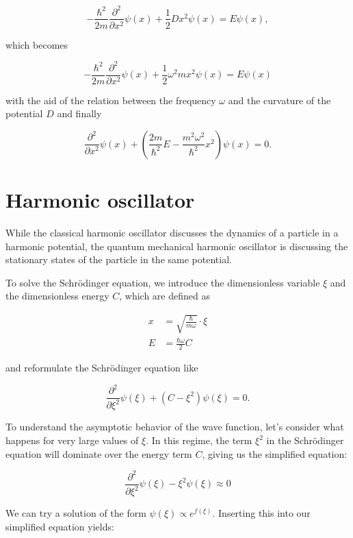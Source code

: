 \documentclass[
  a4paper,
]{book}
\begin{document}
\[
-\frac{\hbar^2}{2m} \frac{\partial^2}{\partial x^2} \psi \left( x \right) + \frac{1}{2} D x^2 \psi \left( x \right) = E \psi \left( x \right) \mathrm{,}
\]

which becomes

\[
-\frac{\hbar^2}{2m} \frac{\partial^2}{\partial x^2} \psi \left( x \right) + \frac{1}{2} \omega^2 m x^2 \psi \left( x \right)  =  E \psi \left( x \right)
\]

with the aid of the relation between the frequency \(\omega\) and the
curvature of the potential \(D\) and finally

\[
\frac{\partial^2}{\partial x^2} \psi \left( x \right) + \left( \frac{2 m}{\hbar^2} E - \frac{m^2 \omega^2}{\hbar^2} x^2 \right) \psi \left( x \right)  = 0 \mathrm{.}
\]

\section{Harmonic oscillator}\label{harmonic-oscillator}

While the classical harmonic oscillator discusses the dynamics of a
particle in a harmonic potential, the quantum mechanical harmonic
oscillator is discussing the stationary states of the particle in the
same potential.

To solve the Schrödinger equation, we introduce the dimensionless
variable \(\xi\) and the dimensionless energy \(C\), which are defined
as

\[
\begin{aligned}
x & = \sqrt{\frac{\hbar}{m \omega}} \cdot \xi\\
E & = \frac{\hbar \omega}{2} C
\end{aligned}
\]

and reformulate the Schrödinger equation like

\[
\frac{\partial^2}{\partial \xi^2} \psi \left( \xi \right) + \left( C - \xi^2 \right) \psi \left( \xi \right)  = 0 \mathrm{.}
\]

To understand the asymptotic behavior of the wave function, let's
consider what happens for very large values of \(\xi\). In this regime,
the term \(\xi^2\) in the Schrödinger equation will dominate over the
energy term \(C\), giving us the simplified equation:

\[\frac{\partial^2}{\partial \xi^2} \psi(\xi) - \xi^2 \psi(\xi) \approx 0\]

We can try a solution of the form \(\psi(\xi) \propto e^{f(\xi)}\).
Inserting this into our simplified equation yields:
\end{document}
